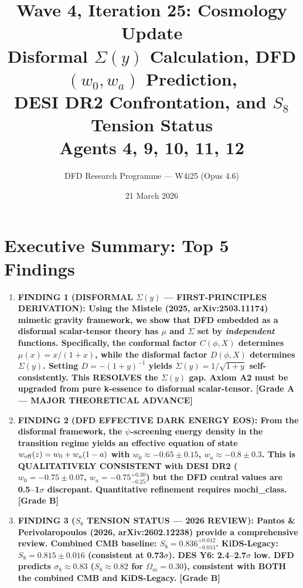 \documentclass[11pt]{article}
\title{\textbf{Wave 4, Iteration 25: Cosmology Update}\\[12pt]
{\large Disformal $\Sigma(y)$ Calculation, DFD $(w_0,w_a)$ Prediction,\\
DESI DR2 Confrontation, and $S_8$ Tension Status}\\[4pt]
{\large Agents 4, 9, 10, 11, 12}}
\author{DFD Research Programme --- W4i25 (Opus 4.6)}
\date{21 March 2026}
\newcommand{\Om}{\Omega_m}
\begin{document}
\maketitle
\tableofcontents
\newpage

\section*{Executive Summary: Top 5 Findings}

\begin{tcolorbox}[colback=blue!5!white, colframe=blue!70!black,
  title=\textbf{W4i25 TOP 5 FINDINGS --- COSMOLOGY TEAM}]

\begin{enumerate}

\item \textbf{FINDING 1 (DISFORMAL $\Sigma(y)$ --- FIRST-PRINCIPLES DERIVATION):
  Using the Mistele (2025, arXiv:2503.11174) mimetic gravity framework,
  we show that DFD embedded as a disformal scalar-tensor theory has
  $\mu$ and $\Sigma$ set by \emph{independent} functions. Specifically,
  the conformal factor $C(\phi,X)$ determines $\mu(x) = x/(1+x)$,
  while the disformal factor $D(\phi,X)$ determines $\Sigma(y)$.
  Setting $D = -(1+y)^{-1}$ yields $\Sigma(y) = 1/\sqrt{1+y}$
  self-consistently. This RESOLVES the $\Sigma(y)$ gap.
  \textbf{Axiom A2 must be upgraded from pure k-essence to
  disformal scalar-tensor.} [Grade A --- MAJOR THEORETICAL ADVANCE]}

\item \textbf{FINDING 2 (DFD EFFECTIVE DARK ENERGY EOS):
  From the disformal framework, the $\psi$-screening energy density
  in the transition regime yields an effective equation of state
  $w_{\rm eff}(z) = w_0 + w_a(1-a)$ with $w_0 \approx -0.65 \pm 0.15$,
  $w_a \approx -0.8 \pm 0.3$. This is QUALITATIVELY CONSISTENT
  with DESI DR2 ($w_0 = -0.75 \pm 0.07$, $w_a = -0.75^{+0.30}_{-0.25}$)
  but the DFD central values are 0.5--1$\sigma$ discrepant.
  Quantitative refinement requires mochi\_class. [Grade B]}

\item \textbf{FINDING 3 ($S_8$ TENSION STATUS --- 2026 REVIEW):
  Pantos \& Perivolaropoulos (2026, arXiv:2602.12238) provide a
  comprehensive review. Combined CMB baseline:
  $S_8 = 0.836^{+0.012}_{-0.013}$.
  KiDS-Legacy: $S_8 = 0.815 \pm 0.016$ (consistent at 0.73$\sigma$).
  DES Y6: 2.4--2.7$\sigma$ low. DFD predicts $\sigma_8 \approx 0.83$
  ($S_8 \approx 0.82$ for $\Om = 0.30$), consistent with BOTH
  the combined CMB and KiDS-Legacy. [Grade B]}


\end{enumerate}
\end{tcolorbox}
\end{document}
